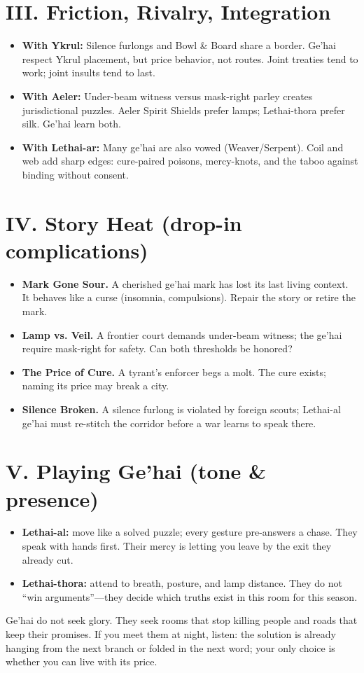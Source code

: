 \documentclass[11pt]{article}
\begin{document}
  \section*{III. Friction, Rivalry, Integration}
  \begin{itemize}
  \item \textbf{With Ykrul:} Silence furlongs and Bowl \& Board share a border. Ge'hai respect Ykrul placement, but price behavior, not routes. Joint treaties tend to work; joint insults tend to last.
  \item \textbf{With Aeler:} Under-beam witness versus mask-right parley creates jurisdictional puzzles. Aeler Spirit Shields prefer lamps; Lethai-thora prefer silk. Ge'hai learn both.
  \item \textbf{With Lethai-ar:} Many ge'hai are also vowed (Weaver/Serpent). Coil and web add sharp edges: cure-paired poisons, mercy-knots, and the taboo against binding without consent.
  \end{itemize}
  
  \section*{IV. Story Heat (drop-in complications)}
  \begin{itemize}
  \item \textbf{Mark Gone Sour.} A cherished ge'hai mark has lost its last living context. It behaves like a curse (insomnia, compulsions). Repair the story or retire the mark.
  \item \textbf{Lamp vs. Veil.} A frontier court demands under-beam witness; the ge'hai require mask-right for safety. Can both thresholds be honored?
  \item \textbf{The Price of Cure.} A tyrant's enforcer begs a molt. The cure exists; naming its price may break a city.
  \item \textbf{Silence Broken.} A silence furlong is violated by foreign scouts; Lethai-al ge'hai must re-stitch the corridor before a war learns to speak there.
  \end{itemize}
  
  \section*{V. Playing Ge'hai (tone \& presence)}
  \begin{itemize}
  \item \textbf{Lethai-al:} move like a solved puzzle; every gesture pre-answers a chase. They speak with hands first. Their mercy is letting you leave by the exit they already cut.
  \item \textbf{Lethai-thora:} attend to breath, posture, and lamp distance. They do not ``win arguments''---they decide which truths exist in this room for this season.
  \end{itemize}
  
  Ge'hai do not seek glory. They seek rooms that stop killing people and roads that keep their promises. If you meet them at night, listen: the solution is already hanging from the next branch or folded in the next word; your only choice is whether you can live with its price.
  
\end{document}
